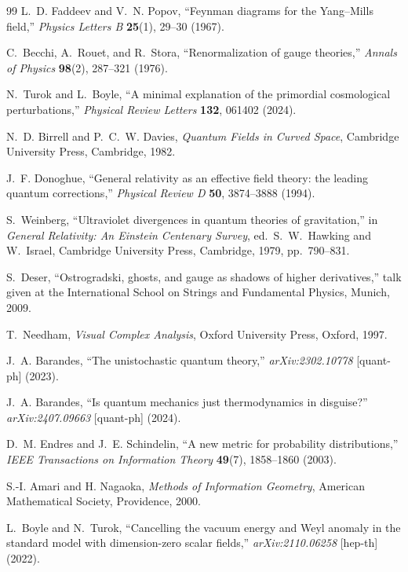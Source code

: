 \documentclass[12pt,a4paper]{article}
\theoremstyle{remark}
\begin{document}
\begin{thebibliography}{99}
L.~D. Faddeev and V.~N. Popov,
``Feynman diagrams for the Yang--Mills field,''
\textit{Physics Letters B} \textbf{25}(1), 29--30 (1967).

C.~Becchi, A.~Rouet, and R.~Stora,
``Renormalization of gauge theories,''
\textit{Annals of Physics} \textbf{98}(2), 287--321 (1976).

N.~Turok and L.~Boyle,
``A minimal explanation of the primordial cosmological perturbations,''
\textit{Physical Review Letters} \textbf{132}, 061402 (2024).

N.~D. Birrell and P.~C.~W. Davies,
\textit{Quantum Fields in Curved Space},
Cambridge University Press, Cambridge, 1982.

J.~F. Donoghue,
``General relativity as an effective field theory: the leading quantum
corrections,''
\textit{Physical Review D} \textbf{50}, 3874--3888 (1994).

S.~Weinberg,
``Ultraviolet divergences in quantum theories of gravitation,''
in \textit{General Relativity: An Einstein Centenary Survey},
ed.\ S.~W.~Hawking and W.~Israel,
Cambridge University Press, Cambridge, 1979, pp.~790--831.

S.~Deser,
``Ostrogradski, ghosts, and gauge as shadows of higher derivatives,''
talk given at the International School on Strings and Fundamental Physics,
Munich, 2009.

T.~Needham,
\textit{Visual Complex Analysis},
Oxford University Press, Oxford, 1997.

J.~A. Barandes,
``The unistochastic quantum theory,''
\textit{arXiv:2302.10778} [quant-ph] (2023).

J.~A. Barandes,
``Is quantum mechanics just thermodynamics in disguise?''
\textit{arXiv:2407.09663} [quant-ph] (2024).

D.~M. Endres and J.~E. Schindelin,
``A new metric for probability distributions,''
\textit{IEEE Transactions on Information Theory} \textbf{49}(7),
1858--1860 (2003).

S.-I. Amari and H. Nagaoka,
\textit{Methods of Information Geometry},
American Mathematical Society, Providence, 2000.



L.~Boyle and N.~Turok,
``Cancelling the vacuum energy and Weyl anomaly in the standard model
with dimension-zero scalar fields,''
\textit{arXiv:2110.06258} [hep-th] (2022).


\end{thebibliography}
\end{document}
